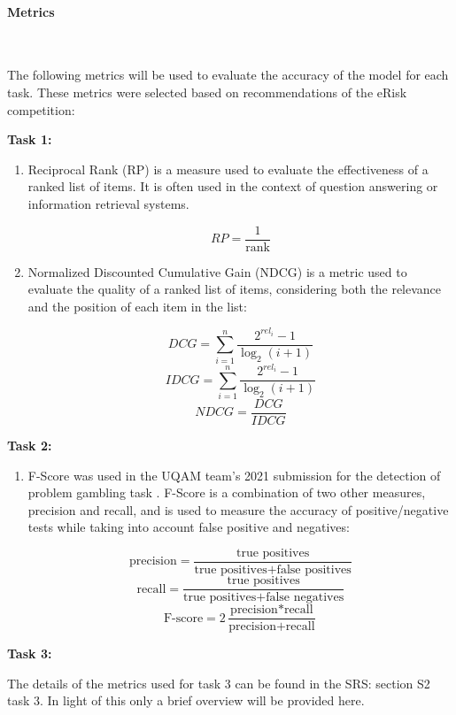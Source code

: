 \documentclass[12pt, titlepage]{article}
\newcommand{\myparagraph}[1]{\paragraph{#1}\mbox{}\\}
\begin{document}
\myparagraph{Metrics} \label{metrics}

The following metrics will be used to evaluate the accuracy of the model for each task. These metrics were selected based on recommendations of the eRisk competition:\newline

\noindent \textbf{Task 1:}

\begin{enumerate}

\item{Reciprocal Rank (RP)} is a measure used to evaluate the effectiveness of a ranked list of items. It is often used in the context of question answering or information retrieval systems.

$$RP = \frac{1}{\text{rank}}$$

\item{Normalized Discounted Cumulative Gain (NDCG)} is a metric used to evaluate the quality of a ranked list of items, considering both the relevance and the position of each item in the list:

$$DCG = \sum_{i=1}^{n} \frac{2^{rel_i} - 1}{\log_2(i + 1)}$$
$$IDCG = \sum_{i=1}^{n} \frac{2^{rel_i} - 1}{\log_2(i + 1)}$$
$$NDCG = \frac{DCG}{IDCG}$$

\end{enumerate}

\noindent \textbf{Task 2:}

\begin{enumerate}

\item{F-Score} was used in the UQAM team's 2021 submission for the detection of problem gambling task \citep{Maupom2021EarlyDO}. F-Score is a combination of two other measures, precision and recall, and is used to measure the accuracy of positive/negative tests while taking into account false positive and negatives:

$$\text{precision} = \frac{\text{true positives}}{\text{true positives} + \text{false positives}}$$
$$\text{recall} = \frac{\text{true positives}}{\text{true positives} + \text{false negatives}}$$
$$\text{F-score} = 2\frac{\text{precision} * \text{recall}}{\text{precision} + \text{recall}}$$

\end{enumerate}

\noindent \textbf{Task 3:}

The details of the metrics used for task 3 can be found in the SRS: section S2 task 3. In light of this only a brief overview will be provided here.
\end{document}
